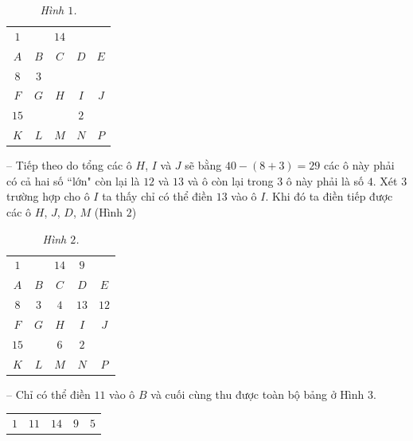 \begin{multicols}{2}
	\begin{table}[H]
		\vspace*{-5pt}
		\centering
		\captionsetup{labelformat= empty, justification=centering}
		\renewcommand{\arraystretch}{1.23}
		\begin{tabular}{|c|c|c|c|c|}
			\hline
			$1$ & & $14$& & \\
			$A$&$B$&$C$&$D$& $E$\\
			\hline
			$8$&$3$&&&\\
			$F$&$G$&$H$&$I$&$J$\\
			\hline
			$15$&&&$2$&\\
			$K$&$L$&$M$&$N$&$P$\\
			\hline
		\end{tabular}
		\caption{\small\textit{\color{toancuabi}Hình $1$.}}
		\vspace*{-10pt}
	\end{table}
	-- Tiếp theo do tổng các ô $H$, $I$ và $J$ sẽ bằng $40-(8+3)= 29$ các ô này phải có cả hai số ``lớn" còn lại là $12$ và $13$ và ô còn lại trong $3$ ô này phải là số $4$. Xét $3$ trường hợp cho ô $I$ ta thấy chỉ có thể điền $13$ vào ô $I$.  Khi đó ta điền tiếp được các ô $H$, $J$, $D$, $M$ (Hình $2$)
	\begin{table}[H]
		\vspace*{-5pt}
		\centering
		\captionsetup{labelformat= empty, justification=centering}
		\renewcommand{\arraystretch}{1.23}
		\begin{tabular}{|c|c|c|c|c|}
			\hline
			$1$ & & $14$&$9$ & \\
			$A$&$B$&$C$&$D$& $E$\\
			\hline
			$8$&$3$&$4$&$13$&$12$\\
			$F$&$G$&$H$&$I$&$J$\\
			\hline
			$15$&&$6$&$2$&\\
			$K$&$L$&$M$&$N$&$P$\\
			\hline
		\end{tabular}
		\caption{\small\textit{\color{toancuabi}Hình $2$.}}
		\vspace*{-10pt}
	\end{table}
	-- Chỉ có thể điền $11$ vào ô $B$ và cuối cùng thu được toàn bộ bảng ở Hình $3$.
	\begin{table}[H]
		\vspace*{-5pt}
		\centering
		\captionsetup{labelformat= empty, justification=centering}
		\renewcommand{\arraystretch}{1.23}
		\begin{tabular}{|c|c|c|c|c|}
			\hline
			$1$ &$11$&$14$&$9$&$5$ \\

\end{tabular}
\end{table}
\end{multicols}

